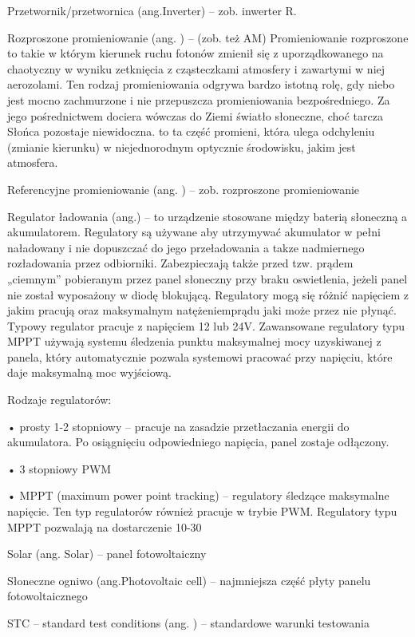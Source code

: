 \documentclass[12pt,a4paper]{article}
\begin{document}
Przetwornik/przetwornica (ang.Inverter) –  zob. inwerter
R.

Rozproszone promieniowanie (ang. ) –  (zob. też AM) Promieniowanie rozproszone to takie w którym kierunek ruchu fotonów zmienił się z uporządkowanego na chaotyczny w wyniku zetknięcia z cząsteczkami atmosfery i zawartymi w niej aerozolami. Ten rodzaj promieniowania odgrywa bardzo istotną rolę, gdy niebo jest mocno zachmurzone i nie przepuszcza promieniowania bezpośredniego. Za jego pośrednictwem dociera wówczas do Ziemi światło słoneczne, choć tarcza Słońca pozostaje niewidoczna. to ta część promieni, która ulega odchyleniu (zmianie kierunku) w niejednorodnym optycznie środowisku, jakim jest  atmosfera.

Referencyjne promieniowanie (ang. ) – zob. rozproszone promieniowanie

Regulator ładowania (ang.) – to urządzenie stosowane między baterią słoneczną a akumulatorem. Regulatory są używane aby utrzymywać akumulator w pełni naładowany i nie dopuszczać do jego przeładowania a takze nadmiernego rozładowania przez odbiorniki. Zabezpieczają także przed tzw. prądem „ciemnym” pobieranym przez panel słoneczny przy braku oswietlenia, jeżeli panel nie został wyposażony w diodę blokującą. Regulatory mogą się różnić napięciem z jakim pracują oraz maksymalnym natężeniemprądu jaki może przez nie płynąć. Typowy regulator pracuje z napięciem 12 lub 24V. Zawansowane regulatory typu MPPT używają systemu śledzenia punktu maksymalnej mocy uzyskiwanej z panela, który automatycznie pozwala systemowi pracować przy napięciu, które daje maksymalną moc wyjściową.

Rodzaje regulatorów:

•    prosty 1-2 stopniowy – pracuje na zasadzie przetłaczania energii do akumulatora. Po osiągnięciu odpowiedniego napięcia, panel zostaje odłączony.

•    3 stopniowy PWM

•    MPPT (maximum power point tracking) – regulatory śledzące maksymalne napięcie. Ten typ regulatorów również pracuje w trybie PWM. Regulatory typu MPPT pozwalają na dostarczenie 10-30%

Solar (ang. Solar) – panel fotowoltaiczny

Słoneczne ogniwo (ang.Photovoltaic cell) – najmniejsza część płyty panelu fotowoltaicznego

STC – standard test conditions (ang. ) – standardowe warunki testowania
\end{document}
